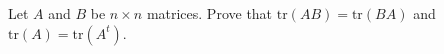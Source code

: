 Let $A$ and $B$ be $n\times n$ matrices. Prove that $\text{tr}(AB) =
\text{tr}(BA)$ and $\text{tr}(A)=\text{tr}(A^t)$.
